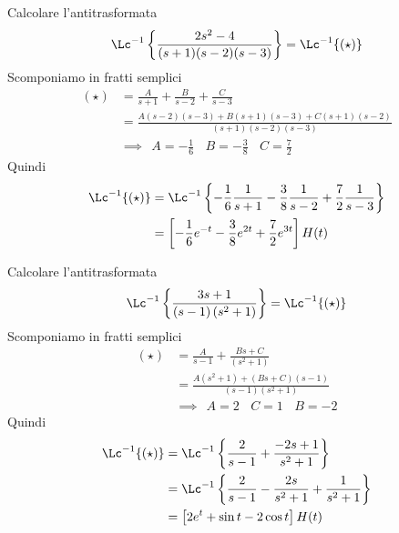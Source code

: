 \Esercizio{}

Calcolare l'antitrasformata
\begin{equation*}
\Lc^{- 1}\left\{\frac{2s^{2} - 4}{(s + 1)(s - 2)(s - 3)}\right\} = \Lc^{- 1}\{(\star)\}
\end{equation*}
Scomponiamo in fratti semplici
\begin{equation*}
\begin{aligned}
(\star) & = \frac{A}{s + 1} + \frac{B}{s - 2} + \frac{C}{s - 3}\\
 & = \frac{A(s - 2)(s - 3) + B(s + 1)(s - 3) + C(s + 1)(s - 2)}{(s + 1)(s - 2)(s - 3)}\\
 & \implies \ \ A = -\frac{1}{6} \ \ \ \ B = -\frac{3}{8} \ \ \ \ C = \frac{7}{2}
\end{aligned}
\end{equation*}
Quindi
\begin{equation*}
\begin{aligned}
\Lc^{- 1}\{(\star)\} & = \Lc^{- 1}\left\{- \frac{1}{6}\frac{1}{s + 1} - \frac{3}{8}\frac{1}{s - 2} + \frac{7}{2}\frac{1}{s - 3}\right\}\\
 & = \left[ - \frac{1}{6} e^{- t} - \frac{3}{8} e^{2t} + \frac{7}{2} e^{3t}\right] H(t)
\end{aligned}
\end{equation*}

\Esercizio{}

Calcolare l'antitrasformata
\begin{equation*}
\Lc^{- 1}\left\{\frac{3s + 1}{(s - 1)\left(s^{2} + 1\right)}\right\} = \Lc^{- 1}\{(\star)\}
\end{equation*}
Scomponiamo in fratti semplici
\begin{equation*}
\begin{aligned}
(\star) & = \frac{A}{s - 1} + \frac{Bs + C}{\left(s^{2} + 1\right)}\\
 & = \frac{A\left(s^{2} + 1\right) + (Bs + C)(s - 1)}{(s - 1)\left(s^{2} + 1\right)}\\
 & \implies \ \ A = 2\ \ \ \ C = 1\ \ \ \ B = -2
\end{aligned}
\end{equation*}
Quindi
\begin{equation*}
\begin{aligned}
\Lc^{- 1}\{(\star)\} & = \Lc^{- 1}\left\{\frac{2}{s - 1} + \frac{- 2s + 1}{s^{2} + 1}\right\}\\
 & = \Lc^{- 1}\left\{\frac{2}{s - 1} - \frac{2s}{s^{2} + 1} + \frac{1}{s^{2} + 1}\right\}\\
 & = \left[ 2e^{t} + \sin t - 2\cos t\right] H(t)
\end{aligned}
\end{equation*}

